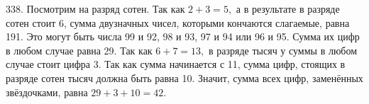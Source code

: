 338. Посмотрим на разряд сотен. Так как $2+3=5,$ а в результате в разряде сотен стоит 6, сумма двузначных чисел, которыми кончаются слагаемые, равна 191. Это могут быть числа 99 и 92, 98 и 93, 97 и 94 или 96 и 95. Сумма их цифр в любом случае равна 29. Так как $6+7=13,$ в разряде тысяч у суммы в любом случае стоит цифра 3. Так как сумма начинается с 11, сумма цифр, стоящих в разряде сотен тысяч должна быть равна 10. Значит, сумма всех цифр, заменённых звёздочками, равна $29+3+10=42.$\\
